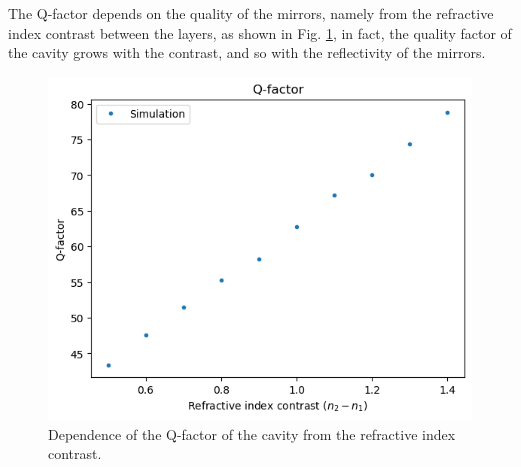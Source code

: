 The Q-factor depends on the quality of the mirrors, namely from the refractive index contrast between the layers, as shown in Fig. \ref{fig:bragg_cavity_qfactor_vs_index}, in fact, the quality factor of the cavity grows with the contrast, and so with the reflectivity of the mirrors.

\begin{figure}[H]
    \centering
    \includegraphics[width=0.6\linewidth]{Figures/bragg_cavity_qfactor_vs_index.png}
    \caption{Dependence of the Q-factor of the cavity from the refractive index contrast.}
    \label{fig:bragg_cavity_qfactor_vs_index}
\end{figure}